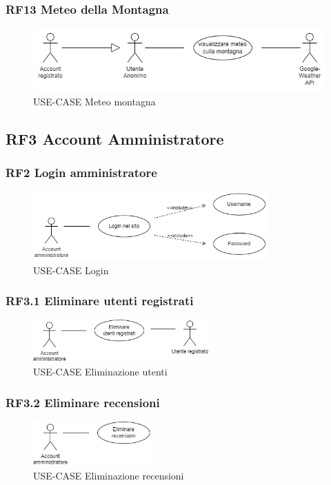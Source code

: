 \documentclass[a4paper,12pt]{article}
\begin{document}
\subsubsection*{RF13 Meteo della Montagna}
\begin{figure}[H]
   \centering
   \includegraphics[width=1\textwidth]{img-D2/meteo.png}
    \caption{USE-CASE Meteo montagna}
\end{figure}


\subsection*{RF3 Account Amministratore}
\subsubsection*{RF2 Login amministratore}
\begin{figure}[H]
   \centering
   \includegraphics[width=0.8\textwidth]{img-D2/login_amministratore.png}
    \caption{USE-CASE Login}
\end{figure}

\subsubsection{RF3.1 Eliminare utenti registrati}
\begin{figure}[H]
   \centering
   \includegraphics[width=0.6\textwidth]{img-D2/eliminazione_utenti.png}
    \caption{USE-CASE Eliminazione utenti}
\end{figure}

\subsubsection{RF3.2 Eliminare recensioni}
\begin{figure}[H]
   \centering
   \includegraphics[width=0.4\textwidth]{img-D2/eliminazione_recensioni.png}
    \caption{USE-CASE Eliminazione recensioni}
\end{figure}
\end{document}
